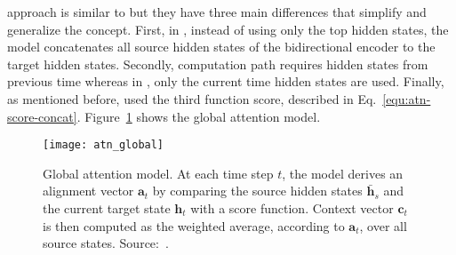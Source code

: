 \citet{1508.04025} approach is similar to \citet{1409.0473} but they have three main differences that simplify and generalize the concept. First, in \citet{1409.0473}, instead of using only the top hidden states, the model concatenates all source hidden states of the bidirectional encoder to the target hidden states.
Secondly, \citet{1409.0473} computation path requires hidden states from previous time whereas in \citet{1508.04025}, only the current time hidden states are used. Finally, as mentioned before, \citet{1409.0473} used the third function score, described in Eq.~\ref{equ:atn-score-concat}.
Figure~\ref{fig:atn_global} shows the global attention model.

\begin{figure}
    \centering
    \texttt{[image: atn\_global]}
    \decoRule
    \caption[Global attention model]{Global attention model. At each time step $t$, the model derives an alignment vector $\bm{a}_t$ by comparing the source hidden states $\bm{\bar{h}}_s$ and the current target state $\bm{h}_t$ with a score function. Context vector $\bm{c}_t$ is then computed as the weighted average, according to $\bm{a}_t$, over all source states. Source:~\citet{1508.04025}.}
    \label{fig:atn_global}
\end{figure}

